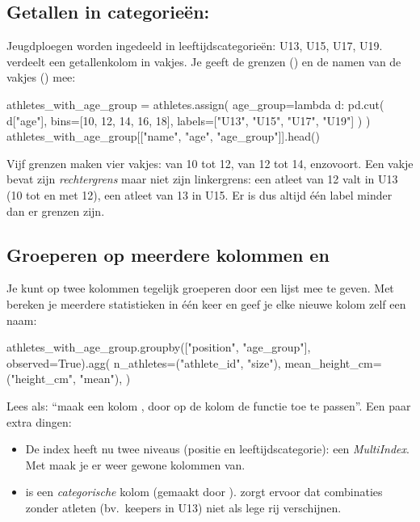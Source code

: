 \documentclass[11pt,a4paper]{article}
\begin{document}
\subsection{Getallen in categorieën: }

Jeugdploegen worden ingedeeld in leeftijdscategorieën: U13, U15, U17,
U19.  verdeelt een getallenkolom in vakjes. Je geeft de
grenzen () en de namen van de vakjes () mee:

\begin{python}
athletes_with_age_group = athletes.assign(
    age_group=lambda d: pd.cut(
        d["age"], bins=[10, 12, 14, 16, 18], labels=["U13", "U15", "U17", "U19"]
    )
)
athletes_with_age_group[["name", "age", "age_group"]].head()
\end{python}

Vijf grenzen maken vier vakjes: van 10 tot 12, van 12 tot 14, enzovoort.
Een vakje bevat zijn \emph{rechtergrens} maar niet zijn linkergrens: een
atleet van 12 valt in U13 (10 tot en met 12), een atleet van 13 in U15.
Er is dus altijd één label minder dan er grenzen zijn.

\subsection{Groeperen op meerdere kolommen en }

Je kunt op twee kolommen tegelijk groeperen door een lijst mee te geven.
Met  bereken je meerdere statistieken in één keer en geef
je elke nieuwe kolom zelf een naam:

\begin{python}
athletes_with_age_group.groupby(["position", "age_group"], observed=True).agg(
    n_athletes=("athlete_id", "size"),
    mean_height_cm=("height_cm", "mean"),
)
\end{python}

Lees  als: ``maak een
kolom , door op de kolom  de
functie  toe te passen''. Een paar extra dingen:

\begin{itemize}
  \item De index heeft nu twee niveaus (positie en leeftijdscategorie):
        een \emph{MultiIndex}. Met  maak je er weer
        gewone kolommen van.
  \item {} is een \emph{categorische} kolom (gemaakt door
        ).  zorgt ervoor dat combinaties
        zonder atleten (bv.\ keepers in U13) niet als lege rij verschijnen.
\end{itemize}
\end{document}
